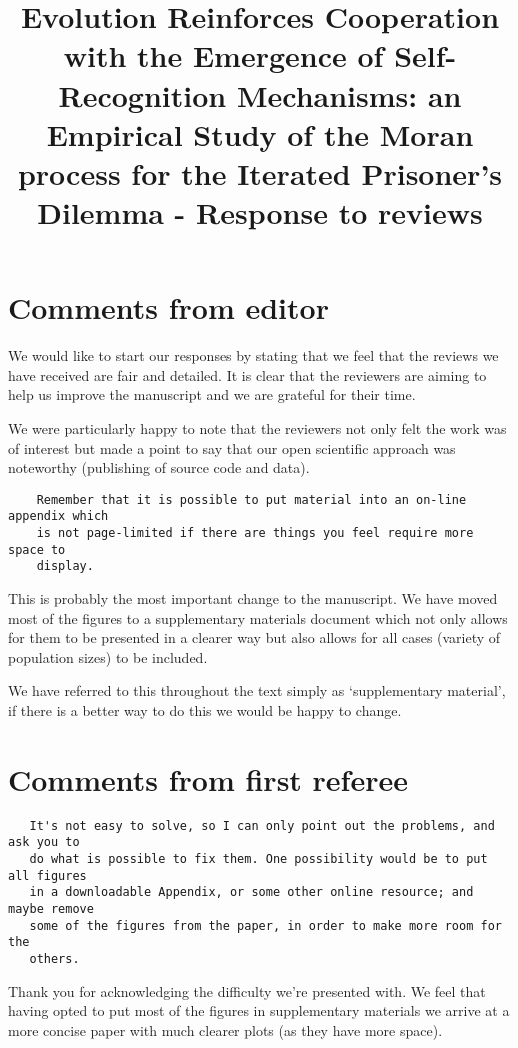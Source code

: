 \documentclass[a4]{article}
\title{Evolution Reinforces Cooperation with the Emergence of Self-Recognition
       Mechanisms: an Empirical Study of the Moran process for the Iterated
       Prisoner's Dilemma - Response to reviews}
\begin{document}
\maketitle

\section{Comments from editor}

We would like to start our responses by stating that we feel that the reviews we
have received are fair and detailed. It is clear that the reviewers are aiming
to help us improve the manuscript and we are grateful for their time.

We were particularly happy to note that the reviewers not only felt the work was
of interest but made a point to say that our open scientific approach was
noteworthy (publishing of source code and data).

\begin{verbatim}
    Remember that it is possible to put material into an on-line appendix which
    is not page-limited if there are things you feel require more space to
    display.
\end{verbatim}

This is probably the most important change to the manuscript. We have moved most
of the figures to a supplementary materials document which not only allows for
them to be presented in a clearer way but also allows for all cases (variety of
population sizes) to be included.

We have referred to this throughout the text simply as `supplementary material',
if there is a better way to do this we would be happy to change.

\section{Comments from first referee}

\begin{verbatim}
   It's not easy to solve, so I can only point out the problems, and ask you to
   do what is possible to fix them. One possibility would be to put all figures
   in a downloadable Appendix, or some other online resource; and maybe remove
   some of the figures from the paper, in order to make more room for the
   others.
\end{verbatim}

Thank you for acknowledging the difficulty we're presented with. We feel that
having opted to put most of the figures in supplementary materials we arrive at
a more concise paper with much clearer plots (as they have more space).
\end{document}
